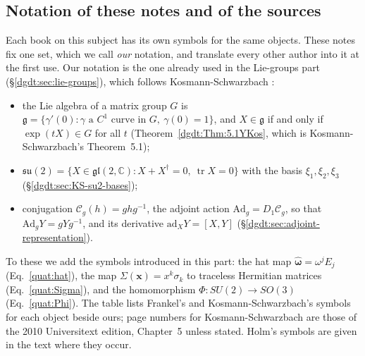 \subsection{Notation of these notes and of the sources}\label{quat:sec:notation}
Each book on this subject has its own symbols for the same objects. These
notes fix one set, which we call \emph{our} notation, and translate every
other author into it at the first use. Our notation is the one already used
in the Lie-groups part (\S\ref{dgdt:sec:lie-groups}), which follows
Kosmann-Schwarzbach \cite{dgdt:YKosmann-Schwarzbach2010}:
\begin{itemize}
 \item the Lie algebra of a matrix group $G$ is
  $\mathfrak g=\{\gamma'(0):\gamma \text{ a } C^1 \text{ curve in } G,\
  \gamma(0)=1\}$, and $X\in\mathfrak g$ if and only if $\exp(tX)\in G$ for
  all $t$ (Theorem~\ref{dgdt:Thm:5.1YKos}, which is Kosmann-Schwarzbach's
  Theorem~5.1);
 \item $\mathfrak{su}(2)=\{X\in\mathfrak{gl}(2,\mathbb C):X+X^\dagger=0,\
  \operatorname{tr}X=0\}$ with the basis $\xi_1,\xi_2,\xi_3$
  (\S\ref{dgdt:sec:KS-su2-bases});
 \item conjugation $\mathcal C_g(h)=ghg^{-1}$, the adjoint action
  $\mathrm{Ad}_g=D_1\mathcal C_g$, so that $\mathrm{Ad}_gY=gYg^{-1}$, and its
  derivative $\mathrm{ad}_XY=[X,Y]$
  (\S\ref{dgdt:sec:adjoint-representation}).
\end{itemize}
To these we add the symbols introduced in this part: the hat map
$\widehat{\boldsymbol\omega}=\omega^jE_j$ (Eq.~\eqref{quat:hat}), the map
$\Sigma(\mathbf x)=x^k\sigma_k$ to traceless Hermitian matrices
(Eq.~\eqref{quat:Sigma}), and the homomorphism
$\Phi\colon SU(2)\to SO(3)$ (Eq.~\eqref{quat:Phi}). The table lists
Frankel's and Kosmann-Schwarzbach's symbols for each object beside ours;
page numbers for Kosmann-Schwarzbach are those of the 2010 Universitext
edition, Chapter~5 unless stated. Holm's symbols are given in the text
where they occur.
